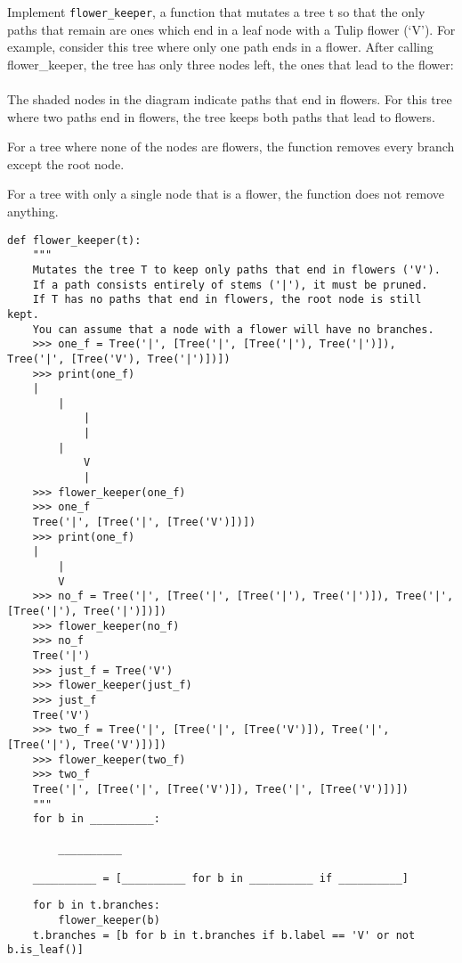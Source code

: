 \question Implement \texttt{flower_keeper}, a function that mutates a tree t so that the only paths that remain are ones which
end in a leaf node with a Tulip flower (‘V’).
For example, consider this tree where only one path ends in a flower. After calling flower_keeper, the tree has
only three nodes left, the ones that lead to the flower:\\\\

The shaded nodes in the diagram indicate paths that end in flowers.
For this tree where two paths end in flowers, the tree keeps both paths that lead to flowers.

For a tree where none of the nodes are flowers, the function removes every branch except the root node.

For a tree with only a single node that is a flower, the function does not remove anything.

\begin{lstlisting}
def flower_keeper(t):
    """
    Mutates the tree T to keep only paths that end in flowers ('V').
    If a path consists entirely of stems ('|'), it must be pruned.
    If T has no paths that end in flowers, the root node is still kept.
    You can assume that a node with a flower will have no branches.
    >>> one_f = Tree('|', [Tree('|', [Tree('|'), Tree('|')]), Tree('|', [Tree('V'), Tree('|')])])
    >>> print(one_f)
    |
        |
            |
            |
        |
            V
            |
    >>> flower_keeper(one_f)
    >>> one_f
    Tree('|', [Tree('|', [Tree('V')])])
    >>> print(one_f)
    |
        |
        V
    >>> no_f = Tree('|', [Tree('|', [Tree('|'), Tree('|')]), Tree('|', [Tree('|'), Tree('|')])])
    >>> flower_keeper(no_f)
    >>> no_f
    Tree('|')
    >>> just_f = Tree('V')
    >>> flower_keeper(just_f)
    >>> just_f
    Tree('V')
    >>> two_f = Tree('|', [Tree('|', [Tree('V')]), Tree('|', [Tree('|'), Tree('V')])])
    >>> flower_keeper(two_f)
    >>> two_f
    Tree('|', [Tree('|', [Tree('V')]), Tree('|', [Tree('V')])])
    """
    for b in __________:

        __________

    __________ = [__________ for b in __________ if __________]
\end{lstlisting}
\begin{solution}[0.5in]
\begin{lstlisting}
    for b in t.branches:
        flower_keeper(b)
    t.branches = [b for b in t.branches if b.label == 'V' or not b.is_leaf()]
\end{lstlisting}
\end{solution}
